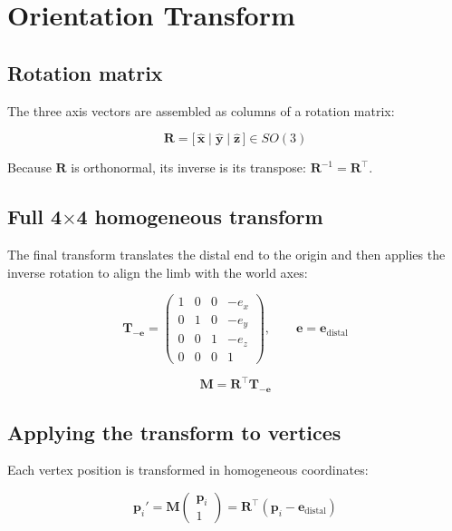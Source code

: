 \documentclass[11pt, a4paper]{article}
\begin{document}
\section{Orientation Transform}

\subsection{Rotation matrix}

The three axis vectors are assembled as columns of a rotation matrix:

\begin{equation}
  \bm{R} = \bigl[\,\hat{\bm{x}} \;\big|\; \hat{\bm{y}} \;\big|\; \hat{\bm{z}}\,\bigr]
  \in SO(3)
\end{equation}

Because $\bm{R}$ is orthonormal, its inverse is its transpose:
$\bm{R}^{-1} = \bm{R}^\top$.

\subsection{Full 4$\times$4 homogeneous transform}

The final transform translates the distal end to the origin and then applies
the inverse rotation to align the limb with the world axes:

\begin{equation}
  \bm{T}_{-\bm{e}} =
  \begin{pmatrix}
    1 & 0 & 0 & -e_x \\
    0 & 1 & 0 & -e_y \\
    0 & 0 & 1 & -e_z \\
    0 & 0 & 0 & 1
  \end{pmatrix},
  \qquad \bm{e} = \bm{e}_{\mathrm{distal}}
\end{equation}

\begin{equation}
  \boxed{\bm{M} = \bm{R}^\top \bm{T}_{-\bm{e}}}
\end{equation}

\subsection{Applying the transform to vertices}

Each vertex position is transformed in homogeneous coordinates:

\begin{equation}
  \bm{p}_i' =
  \bm{M}
  \begin{pmatrix} \bm{p}_i \\ 1 \end{pmatrix}
  = \bm{R}^\top (\bm{p}_i - \bm{e}_{\mathrm{distal}})
\end{equation}
\end{document}
